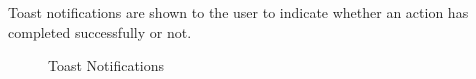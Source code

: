 \documentclass[10pt,a4paper]{article}
\begin{document}
Toast notifications are shown to the user to indicate whether an action has completed successfully or not.
\begin{figure}
    \centering
    \qquad
    \caption{Toast Notifications}
    \label{fig:toast}
\end{figure}

\clearpage
\end{document}
